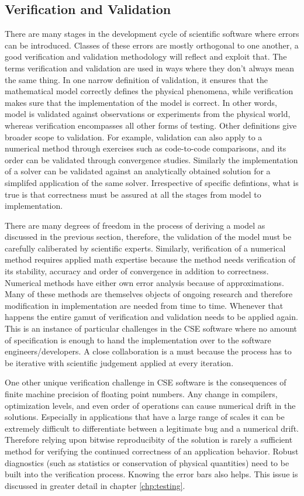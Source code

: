 \subsection{Verification and Validation}
\label{sec:vandv}
There are many stages in the development cycle of scientific software 
where errors can be introduced. Classes of these errors are mostly
orthogonal to one another, a good verification and validation
methodology will reflect and exploit that. The terms verification and 
validation are used in ways where they don't always mean the same
thing. In one narrow definition of validation, it ensures that the
mathematical model correctly defines the physical phenomena, while
verification makes sure that the implementation of the model is
correct. In other words, model is validated against observations or
experiments from the physical world, whereas verification encompasses
all other forms of  testing.   Other definitions give broader scope to
validation. For example, validation can also apply to a numerical
method through exercises such as code-to-code comparisons, and its
order can be validated through convergence studies. Similarly the
implementation of a solver can be validated against an analytically
obtained solution for a simplifed application of the same
solver. Irrespective of  specific defintions, what is true is that
correctness must be assured at all the stages from model to
implementation.  

There are many degrees of freedom in the process of deriving a
model as discussed in the previous section, therefore, the validation of the
model must be carefully caliberated by scientific experts. Similarly,
verification of a numerical method requires applied math expertise
because the method needs verification of its stability, accuracy and
order of  convergence in addition to correctness. Numerical methods
have either own error analysis because of approximations. Many of
these methods are themselves objects of ongoing research and therefore
modification in implementation are needed from time to time. Whenever
that happens the entire gamut of verification and validation needs to
be applied again. This is an instance of particular challenges in the
CSE software where no amount of specification is enough to hand the
implementation over to the software engineers/developers. A close
collaboration is a must because the process has to be iterative with
scientific judgement applied at every iteration. 

One other unique verification challenge in CSE software is the
consequences of finite machine precision of floating point
numbers. Any change in compilers, optimization levels, and even order
of operations can cause numerical drift in the solutions. Especially
in applications that have a large range of scales it can be extremely
difficult to differentiate between a legitimate bug and a numerical
drift. Therefore relying upon bitwise reproducibity of the solution is
rarely a sufficient method for verifying the continued correctness of
an application behavior. Robust diagnostics (such as statistics or
conservation of physical quantities) need to be built into the
verification process. Knowing the error bars also helps. This issue is
discussed in greater detail in chapter \ref{chp:testing}.

